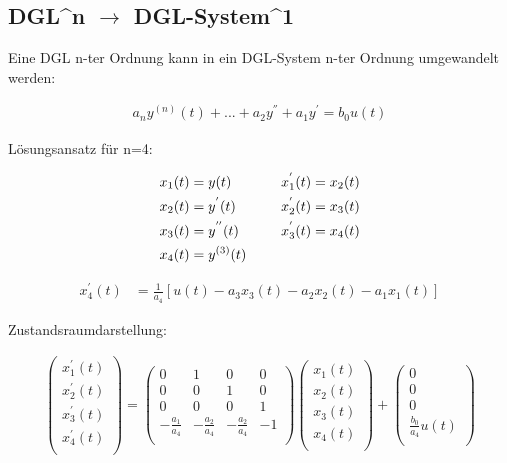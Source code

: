 \documentclass[10pt,a4paper]{article}
\begin{document}
\subsection{DGL^n $\rightarrow$ DGL-System^1}
Eine DGL n-ter Ordnung kann in ein DGL-System n-ter Ordnung umgewandelt werden:
  \begin{mdframed}[style=exercise]
    \begin{align}
        a_n y^{(n)}(t) + ... + a_2 y^{''} + a_1 y^{'} = b_0u(t)
    \end{align}
  \end{mdframed}
Lösungsansatz für n=4: 
  \begin{mdframed}[style=exercise]
    \begin{align}
        x_1(t) &= y(t) & \indent      x_1^{'}(t) &= x_2(t)\\
        x_2(t) &= y^{'}(t) &\indent   x_2^{'}(t) &= x_3(t)\\
        x_3(t) &= y^{''}(t) &\indent  x_3^{'}(t) &= x_4(t)\\
        x_4(t) &= y^{(3)}(t) &\indent 
    \end{align}
  \end{mdframed}
  \begin{mdframed}[style=exercise]
    \begin{align}
        x_4^{'}(t) &= \frac{1}{a_4}[u(t)-a_3x_3(t)-a_2x_2(t)-a_1x_1(t)]
    \end{align}
  \end{mdframed}
Zustandsraumdarstellung:
  \begin{mdframed}[style=exercise]
    \begin{align}
        \begin{pmatrix}
        x_1^{'}(t) \\
        x_2^{'}(t) \\
        x_3^{'}(t) \\
        x_4^{'}(t) \\
        \end{pmatrix} 
        =
        \begin{pmatrix}
            0 & 1 & 0 & 0 \\
            0 & 0 & 1 & 0 \\
            0 & 0 & 0 & 1 \\
            -\frac{a_1}{a_4} & -\frac{a_2}{a_4} & -\frac{a_2}{a_4} &  -1 \\
        \end{pmatrix}
        \begin{pmatrix}
        x_1(t) \\
        x_2(t) \\
        x_3(t) \\
        x_4(t) \\
        \end{pmatrix} 
        +
        \begin{pmatrix}
        0 \\
        0 \\
        0 \\
        \frac{b_0}{a_4}u(t) \\
        \end{pmatrix} 
    \end{align}
  \end{mdframed}
\end{document}
